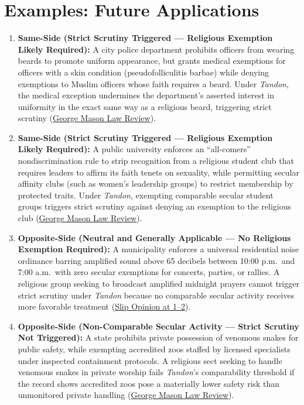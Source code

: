 \documentclass[12pt]{article}
\begin{document}
\section{Examples: Future Applications}
\begin{enumerate}
\item \textbf{Same-Side (Strict Scrutiny Triggered --- Religious Exemption Likely Required):} A city police department prohibits officers from wearing beards to promote uniform appearance, but grants medical exemptions for officers with a skin condition (pseudofolliculitis barbae) while denying exemptions to Muslim officers whose faith requires a beard. Under \textit{Tandon}, the medical exception undermines the department's asserted interest in uniformity in the exact same way as a religious beard, triggering strict scrutiny (\href{https://lawreview.gmu.edu/print__issues/religious-and-secular-comparators/}{George Mason Law Review}).
\item \textbf{Same-Side (Strict Scrutiny Triggered --- Religious Exemption Likely Required):} A public university enforces an ``all-comers'' nondiscrimination rule to strip recognition from a religious student club that requires leaders to affirm its faith tenets on sexuality, while permitting secular affinity clubs (such as women's leadership groups) to restrict membership by protected traits. Under \textit{Tandon}, exempting comparable secular student groups triggers strict scrutiny against denying an exemption to the religious club (\href{https://lawreview.gmu.edu/print__issues/religious-and-secular-comparators/}{George Mason Law Review}).
\item \textbf{Opposite-Side (Neutral and Generally Applicable --- No Religious Exemption Required):} A municipality enforces a universal residential noise ordinance barring amplified sound above 65 decibels between 10:00 p.m.\ and 7:00 a.m.\ with zero secular exemptions for concerts, parties, or rallies. A religious group seeking to broadcast amplified midnight prayers cannot trigger strict scrutiny under \textit{Tandon} because no comparable secular activity receives more favorable treatment (\href{https://www.supremecourt.gov/opinions/20pdf/20a151_4g15.pdf}{Slip Opinion at 1--2}).
\item \textbf{Opposite-Side (Non-Comparable Secular Activity --- Strict Scrutiny Not Triggered):} A state prohibits private possession of venomous snakes for public safety, while exempting accredited zoos staffed by licensed specialists under inspected containment protocols. A religious sect seeking to handle venomous snakes in private worship fails \textit{Tandon}'s comparability threshold if the record shows accredited zoos pose a materially lower safety risk than unmonitored private handling (\href{https://lawreview.gmu.edu/print__issues/religious-and-secular-comparators/}{George Mason Law Review}).

\end{enumerate}
\end{document}
